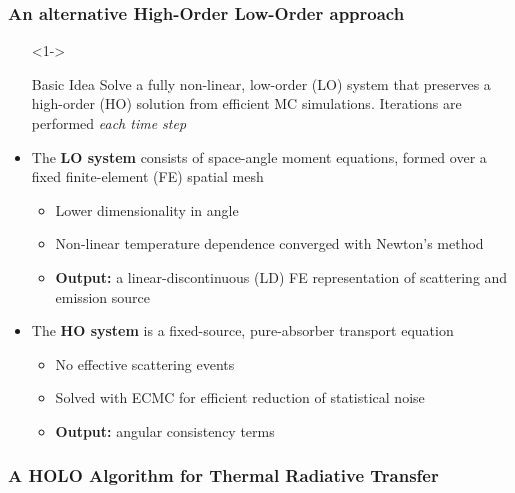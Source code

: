 \documentclass[xcolor=dvipsnames,hyperref={pdfpagelabels=false},unknownkeysallowed]{beamer}
\newcommand{\colb}[1]{{\color{blue} #1}}
\newlength{\wideitemsep}
\let\olditem\item
\renewcommand{\item}{\setlength{\itemsep}{\wideitemsep}\olditem}
\newcommand{\shorttitle}{\color{black} A HOLO Algorithm for Thermal Radiative Transfer}
\begin{document}
\begin{frame}
    \frametitle{An alternative  High-Order Low-Order approach}
    {\small
        \begin{itemize}
            \item[]<1-> \begin{block}{Basic Idea} Solve a fully non-linear, low-order (LO) system
                that preserves a high-order (HO) solution from efficient MC
            simulations. Iterations are performed \emph{each time step}\end{block}
                \vspace{-0.321in}
            \item<2-> The \textbf{LO system} consists of space-angle moment equations, formed over a fixed finite-element (FE) spatial mesh
                \begin{itemize}
                    \item<2-> \colb{Lower dimensionality} in angle
              \item<2-> Non-linear temperature dependence converged with Newton's method 
              \item<2-> \textbf{Output:} a linear-discontinuous (LD) FE representation
                        of scattering and emission source
                \end{itemize}
                \vspace{-0.1in}
            \item<3-> The \textbf{HO system} is a fixed-source, pure-absorber
                transport equation
                \begin{itemize}
                    \item<3-> \colb{No effective scattering} events
                    \item<3-> Solved with ECMC for efficient reduction of statistical noise 
                    \item<3-> \textbf{Output:} angular consistency terms
                \end{itemize}
        \end{itemize}
    }
\end{frame}


\begin{frame}
    \frametitle{\shorttitle}
\begin{minipage}{0.061\linewidth}
\hfill                      
\end{minipage}
\begin{minipage}{0.8\linewidth}
\tableofcontents[
hideothersubsections,
sectionstyle=show,
subsectionstyle=hide
]
\end{minipage}

\end{frame}
\end{document}
